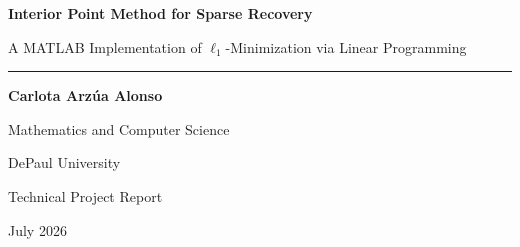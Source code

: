 \documentclass[11pt]{article}
\newcommand{\R}{\mathbb{R}}
\newcommand{\norm}[1]{\left\lVert #1 \right\rVert}
\begin{document}
\begin{titlepage}
  \centering
  \vspace*{1.2in}
  {\Huge\bfseries\color{navy} Interior Point Method for Sparse Recovery\par}
  \vspace{0.35in}
  {\Large A MATLAB Implementation of $\ell_1$-Minimization via Linear Programming\par}
  \vspace{0.8in}

  \rule{0.78\textwidth}{0.8pt}\par
  \vspace{0.45in}
  {\Large\bfseries Carlota Arzúa Alonso\par}
  \vspace{0.15in}
  {\large Mathematics and Computer Science\par}
  {\large DePaul University\par}
  \vspace{0.45in}
  {\large Technical Project Report\par}
  \vfill
  {\large July 2026\par}
\end{titlepage}


\begin{abstract}
This report presents a MATLAB implementation of an Interior Point Method for recovering a sparse vector from an underdetermined linear system. The problem begins with a measurement matrix $A_0 \in \R^{52\times 128}$ and a measurement vector $b=A_0x$, where the unknown vector $x\in\R^{128}$ contains only five nonzero entries. Recovery is formulated as the convex optimization problem $\min_x \norm{x}_1$ subject to $A_0x=b$. By decomposing the signed vector into nonnegative positive and negative components, the problem is converted into a linear program with 256 decision variables. A custom Newton-style Interior Point iteration is then implemented directly in MATLAB without calling the built-in \texttt{linprog} solver. In the reported run, the method recovered all five nonzero locations correctly, achieved an $\ell_2$ recovery error of approximately $0.004598$, a relative $\ell_2$ error of $0.055880\%$, and a maximum absolute error of $0.002500$. The project demonstrates the connection between convex optimization, sparse recovery, numerical linear algebra, and scientific software design.
\end{abstract}
\end{document}
